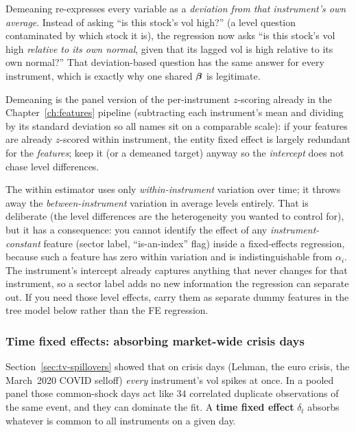 \begin{intuition}
Demeaning re-expresses every variable as a \emph{deviation from that
instrument's own average}.  Instead of asking ``is this stock's vol high?'' (a
level question contaminated by which stock it is), the regression now asks ``is
this stock's vol high \emph{relative to its own normal}, given that its lagged
vol is high relative to its own normal?''  That deviation-based question has the
same answer for every instrument, which is exactly why one shared $\bm{\beta}$ is
legitimate.
\end{intuition}

\begin{projectconnection}
Demeaning is the panel version of the per-instrument $z$-scoring already in the
Chapter~\ref{ch:features} pipeline (subtracting each instrument's mean and
dividing by its standard deviation so all names sit on a comparable scale): if
your features are already $z$-scored within instrument, the entity fixed effect is
largely redundant for the \emph{features}; keep it (or a demeaned target) anyway
so the \emph{intercept} does not chase level differences.
\end{projectconnection}

\begin{warning}
The within estimator uses only \emph{within-instrument} variation over time; it
throws away the \emph{between-instrument} variation in average levels entirely.
That is deliberate (the level differences are the heterogeneity you wanted to
control for), but it has a consequence: you cannot identify the effect of any
\emph{instrument-constant} feature (sector label, ``is-an-index'' flag) inside a
fixed-effects regression, because such a feature has zero within variation and
is indistinguishable from $\alpha_i$.  The instrument's intercept already
captures anything that never changes for that instrument, so a sector label adds
no new information the regression can separate out.  If you need those level
effects, carry them as
separate dummy features in the tree model below rather than the FE regression.
\end{warning}

\subsubsection*{Time fixed effects: absorbing market-wide crisis days}

Section~\ref{sec:tv-spillovers} showed that on crisis days (Lehman, the euro
crisis, the March~2020 COVID selloff) \emph{every} instrument's vol spikes at
once.  In a pooled panel those common-shock days act like $34$ correlated
duplicate observations of the same event, and they can dominate the fit.  A
\textbf{time fixed effect} $\delta_t$ absorbs whatever is common to all
instruments on a given day.

